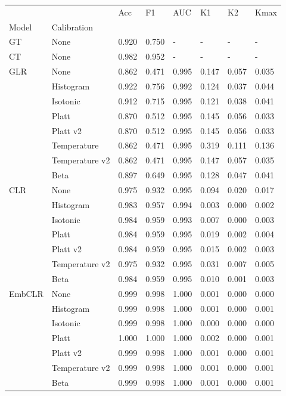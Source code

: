\begin{tabular}{llllllll}
\toprule
 &  & Acc & F1 & AUC & K1 & K2 & Kmax \\
Model & Calibration &  &  &  &  &  &  \\
\midrule
GT & None & 0.920 & 0.750 & - & - & - & - \\
\cline{1-8}
CT & None & 0.982 & 0.952 & - & - & - & - \\
\cline{1-8}
\multirow[t]{8}{*}{GLR} & None & 0.862 & 0.471 & 0.995 & 0.147 & 0.057 & 0.035 \\
 & Histogram & 0.922 & 0.756 & 0.992 & 0.124 & 0.037 & 0.044 \\
 & Isotonic & 0.912 & 0.715 & 0.995 & 0.121 & 0.038 & 0.041 \\
 & Platt & 0.870 & 0.512 & 0.995 & 0.145 & 0.056 & 0.033 \\
 & Platt v2 & 0.870 & 0.512 & 0.995 & 0.145 & 0.056 & 0.033 \\
 & Temperature & 0.862 & 0.471 & 0.995 & 0.319 & 0.111 & 0.136 \\
 & Temperature v2 & 0.862 & 0.471 & 0.995 & 0.147 & 0.057 & 0.035 \\
 & Beta & 0.897 & 0.649 & 0.995 & 0.128 & 0.047 & 0.041 \\
\cline{1-8}
\multirow[t]{7}{*}{CLR} & None & 0.975 & 0.932 & 0.995 & 0.094 & 0.020 & 0.017 \\
 & Histogram & 0.983 & 0.957 & 0.994 & 0.003 & 0.000 & 0.002 \\
 & Isotonic & 0.984 & 0.959 & 0.993 & 0.007 & 0.000 & 0.003 \\
 & Platt & 0.984 & 0.959 & 0.995 & 0.019 & 0.002 & 0.004 \\
 & Platt v2 & 0.984 & 0.959 & 0.995 & 0.015 & 0.002 & 0.003 \\
 & Temperature v2 & 0.975 & 0.932 & 0.995 & 0.031 & 0.007 & 0.005 \\
 & Beta & 0.984 & 0.959 & 0.995 & 0.010 & 0.001 & 0.003 \\
\cline{1-8}
\multirow[t]{7}{*}{EmbCLR} & None & 0.999 & 0.998 & 1.000 & 0.001 & 0.000 & 0.000 \\
 & Histogram & 0.999 & 0.998 & 1.000 & 0.001 & 0.000 & 0.001 \\
 & Isotonic & 0.999 & 0.998 & 1.000 & 0.000 & 0.000 & 0.000 \\
 & Platt & 1.000 & 1.000 & 1.000 & 0.002 & 0.000 & 0.001 \\
 & Platt v2 & 0.999 & 0.998 & 1.000 & 0.001 & 0.000 & 0.001 \\
 & Temperature v2 & 0.999 & 0.998 & 1.000 & 0.001 & 0.000 & 0.001 \\
 & Beta & 0.999 & 0.998 & 1.000 & 0.001 & 0.000 & 0.001 \\
\cline{1-8}
\bottomrule
\end{tabular}
